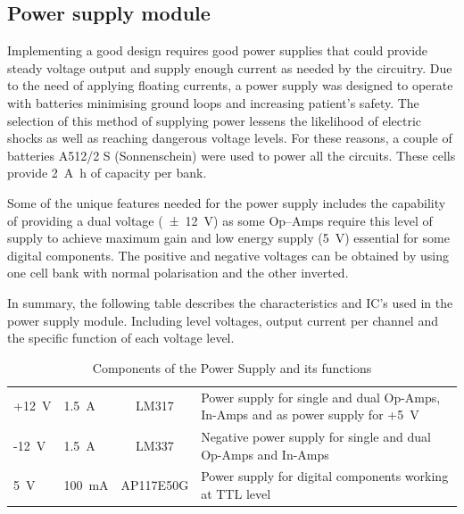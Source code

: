 
\subsection{Power supply module}
Implementing a good design requires good power supplies that could provide steady voltage output and supply enough current as needed by the circuitry. Due to the need of applying floating currents, a power supply was designed to operate with batteries minimising ground loops and increasing patient's safety.  The selection of this method of supplying power lessens the likelihood of electric shocks as well as reaching dangerous voltage levels. For these reasons, a couple of batteries A512/2 S (Sonnenschein) were used to power all the circuits. These cells provide \SI{2}{\ampere\hour} of capacity per bank.

Some of the unique features needed for the power supply includes the capability of providing a dual voltage (\SI{\pm 12}{\volt}) as some Op–Amps require this level of supply to achieve maximum gain and low energy supply (\SI{5}{\volt}) essential for some digital components. The positive and negative voltages can be obtained by using one cell bank with normal polarisation and the other inverted. 

In summary, the following table describes the characteristics and IC's used in the power supply module. Including level voltages, output current per channel and the specific function of each voltage level. 

\begin{table}[!htpb]
	\caption{Components of the Power Supply and its functions}
	\centering
	\label{table:power supply details}
	\begin{tabular}{p{2 cm} p{2 cm} c p{6 cm}}
		\toprule
		\centering{\textbf{Voltage supply}} & \centering{\textbf{Current supply}} & \centering{\textbf{IC}} & \centering{\textbf{Function}} \tabularnewline \midrule
		+\SI{12}{\volt} & \SI{1.5}{\ampere} & LM317 & Power supply for single and dual Op-Amps, In-Amps and as power supply for +\SI{5}{\volt} \tabularnewline \midrule 
		-\SI{12}{\volt} & \SI{1.5}{\ampere} & LM337 & Negative power supply for single and dual Op-Amps and In-Amps \tabularnewline \midrule 
		\SI{5}{\volt} & \SI{100}{\milli\ampere} & AP117E50G & Power supply for digital components working at TTL level \tabularnewline \bottomrule 
	\end{tabular}
\end{table}

